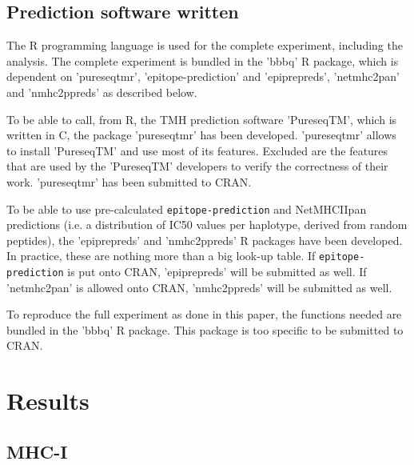 \subsection{Prediction software written}

The R programming language is used for the complete 
experiment, including the analysis.
The complete experiment is bundled in the 'bbbq' R package,
which is dependent on 'pureseqtmr', 
'epitope-prediction' and 'epiprepreds',
'netmhc2pan' and 'nmhc2ppreds'
as described below.

To be able to call, from R, the TMH prediction software 'PureseqTM',
which is written in C, the package 'pureseqtmr' has been developed. 
'pureseqtmr' allows to install 'PureseqTM' and use most of its features.
Excluded are the features that are used by the 'PureseqTM' 
developers to verify the correctness of their work.
'pureseqtmr' has been submitted to CRAN.

To be able to use pre-calculated 
\verb;epitope-prediction; and NetMHCIIpan
predictions (i.e. a distribution of IC50 values per haplotype, 
derived from random peptides), the 'epiprepreds' and 'nmhc2ppreds' 
R packages have been 
developed. In practice, these are nothing more than a big look-up table.
If \verb;epitope-prediction; is put onto CRAN, 'epiprepreds'
will be submitted as well.
If 'netmhc2pan' is allowed onto CRAN, 'nmhc2ppreds'
will be submitted as well.

To reproduce the full experiment as done in this paper,
the functions needed are bundled in the 'bbbq' R package.
This package is too specific to be submitted to CRAN.

\section{Results}

\subsection{MHC-I}

